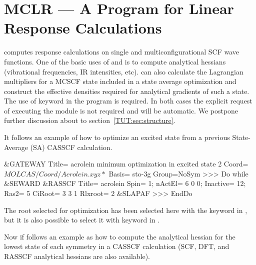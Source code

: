 \section{MCLR --- A Program for Linear Response Calculations}
\label{TUT:sec:mclr} 

 computes response calculations on single and multiconfigurational
SCF wave functions. One of the basic uses of  and 
is to compute analytical hessians (vibrational frequencies, IR intensities, etc).
 can also calculate the Lagrangian multipliers for
a MCSCF state included in a state average optimization and construct the effective
densities required for analytical gradients of such a state.
The use of keyword  in the  program is required.
In both cases the explicit request of executing the  module is not
required and will be automatic.
We postpone further
discussion about  to section~\ref{TUT:sec:structure}.

It follows an example of how to optimize an excited state from a previous
State-Average (SA) CASSCF calculation. 

\begin{inputlisting}
 &GATEWAY
Title= acrolein minimum optimization in excited state 2
Coord=$MOLCAS/Coord/Acrolein.xyz
*$
Basis= sto-3g
Group=NoSym
>>> Do while
 &SEWARD
 &RASSCF
Title= acrolein
Spin= 1; nActEl= 6 0 0; Inactive= 12; Ras2= 5
CiRoot= 3 3 1
Rlxroot= 2
 &SLAPAF
>>> EndDo
\end{inputlisting}

The root selected for optimization has been selected here with the keyword
 in , but it is also possible to select it
with keyword  in .

Now if follows an example as how to compute the analytical hessian for the lowest
state of each symmetry in a CASSCF calculation (SCF, DFT, and RASSCF analytical
hessians are also available).


